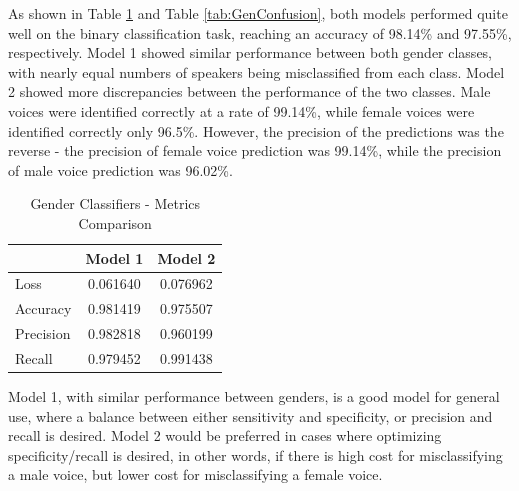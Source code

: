 As shown in Table \ref{tab:GenMetricsSum} and Table \ref{tab:GenConfusion}, both models performed quite well on the binary classification task, reaching an accuracy of 98.14\% and 97.55\%, respectively. Model 1 showed similar performance between both gender classes, with nearly equal numbers of speakers being misclassified from each class. Model 2 showed more discrepancies between the performance of the two classes. Male voices were identified correctly at a rate of 99.14\%, while female voices were identified correctly only 96.5\%. However, the precision of the predictions was the reverse - the precision of female voice prediction was 99.14\%, while the precision of male voice prediction was 96.02\%.

\begin{table}[h]
\begin{center}
\caption{Gender Classifiers - Metrics Comparison}
\begin{tabular}{l c c}
& 	Model 1 & Model 2 \\ \hline
Loss	&0.061640 & 0.076962 \\
Accuracy& 0.981419 & 0.975507 \\
Precision & 0.982818 & 0.960199 \\
Recall & 0.979452 & 0.991438 \\
\end{tabular}
\label{tab:GenMetricsSum}
\end{center}
\end{table}

Model 1, with similar performance between genders, is a good model for general use, where a balance between either sensitivity and specificity, or precision and recall is desired. Model 2 would be preferred in cases where optimizing specificity/recall is desired, in other words, if there is high cost for misclassifying a male voice, but lower cost for misclassifying a female voice.

